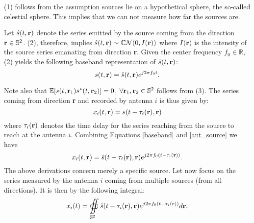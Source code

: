 \documentclass[11pt]{article}
\begin{document}
(1) follows from the assumption sources lie on a hypothetical sphere, the so-called celestial sphere. This implies that we can not measure how far the sources are.
 \vspace{3mm}
 
Let $\hat{s}(t,{\bf r})$ denote the series emitted by the source coming from the direction ${\bf r} \in \mathbb{S}^2$. (2), therefore, implies $\hat{s}(t,{\bf r}) \sim \mathbb{C}\mathcal{N}(0,I(\bf{r}))$ where $I(\bf{r})$ is the intensity of the source series emanating from direction {\bf r}. Given the center frequency $f_0 \in \mathbb{R}$, (2) yields the following baseband representation of $\hat{s}(t,{\bf r})$:
\begin{equation}
 s(t,{\bf r}) = \hat{s}(t,{\bf r})e^{j2\pi f_0t}.\label{baseband}
 \end{equation}
 
Note also that $\mathbb{E}[s(t,{\bf r}_1)s^*(t,{\bf r}_2)] =0$, $\forall {\bf r}_1, {\bf r}_2 \in \mathbb{S}^2$ follows from (3). 
The series coming from direction {\bf r} and recorded by antenna $i$ is thus given by:
\begin{equation}
x_i(t,{\bf r}) = s(t-\tau_{i}({\bf r}),{\bf r}) \label{ant_source}
\end{equation} 
 where $\tau_i({\bf r})$ denotes the time delay for the series reaching from the source to reach at the antenna $i$. Combining Equations \ref{baseband} and \ref{ant_source} we have
 \begin{equation}
 x_i(t,{\bf r}) = \hat{s}(t-\tau_{i}({\bf r}),{\bf r})e^{j2\pi f_0(t-\tau_{i}({\bf r}))}.
 \end{equation}
The above derivations concern merely a specific source. Let now focus on the series measured by the antenna $i$ coming from multiple sources (from all directions). It is then by the following integral:
\begin{equation}
x_i(t) = \oiint \displaylimits_{\mathbb{S}^2} \hat{s}(t-\tau_i({\bf r}), {\bf r})e^{j2\pi f_0(t-\tau_i({\bf r}))}d{\bf r}. \label{int_sour}
\end{equation}
 
\end{document}
